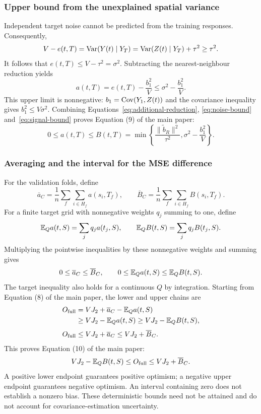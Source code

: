 \subsubsection{Upper bound from the unexplained spatial variance}
\label{sec:bound-signal}
Independent target noise cannot be predicted from the training responses. Consequently,
\[
 V-e(t,T)=\operatorname{Var}(Y(t)\mid Y_T)
 =\operatorname{Var}(Z(t)\mid Y_T)+\tau^2\geq\tau^2.
\]
It follows that $e(t,T)\leq V-\tau^2=\sigma^2$. Subtracting the nearest-neighbour reduction yields
\begin{equation}
 a(t,T)=e(t,T)-\frac{b_1^2}{V}
 \leq\sigma^2-\frac{b_1^2}{V}.
 \label{eq:signal-bound}
\end{equation}
This upper limit is nonnegative: $b_1=\operatorname{Cov}(Y_1,Z(t))$ and the covariance inequality gives $b_1^2\leq V\sigma^2$. Combining Equations~\eqref{eq:additional-reduction}, \eqref{eq:noise-bound} and~\eqref{eq:signal-bound} proves Equation (9) of the main paper:
\begin{equation}
 0\leq a(t,T)\leq B(t,T)
 =\min\left\{\frac{\|\widetilde b_R\|^2}{\tau^2},
               \sigma^2-\frac{b_1^2}{V}\right\}.
 \label{eq:pointwise-bound}
\end{equation}

\subsubsection{Averaging and the interval for the MSE difference}
\label{sec:bound-averaging}
For the validation folds, define
\[
 \overline a_C=\frac1n\sum_f\sum_{i\in H_f}a(s_i,T_f),
 \qquad
 \overline B_C=\frac1n\sum_f\sum_{i\in H_f}B(s_i,T_f).
\]
For a finite target grid with nonnegative weights $q_j$ summing to one, define
\[
 \mathbb{E}_Qa(t,S)=\sum_jq_j a(t_j,S),\qquad
 \mathbb{E}_QB(t,S)=\sum_jq_j B(t_j,S).
\]
Multiplying the pointwise inequalities by these nonnegative weights and summing gives
\[
 0\leq\overline a_C\leq\overline B_C,
 \qquad 0\leq\mathbb{E}_Qa(t,S)\leq\mathbb{E}_QB(t,S).
\]
The target inequality also holds for a continuous $Q$ by integration. Starting from Equation (8) of the main paper, the lower and upper chains are
\begin{align*}
 O_{\mathrm{full}}
 &=VJ_2+\overline a_C-\mathbb{E}_Qa(t,S)\\
 &\geq VJ_2-\mathbb{E}_Qa(t,S)\geq VJ_2-\mathbb{E}_QB(t,S),\\[3pt]
 O_{\mathrm{full}}
 &\leq VJ_2+\overline a_C\leq VJ_2+\overline B_C.
\end{align*}
This proves Equation (10) of the main paper:
\begin{equation}
 VJ_2-\mathbb{E}_QB(t,S)\leq O_{\mathrm{full}}
 \leq VJ_2+\overline B_C.
 \label{eq:optimism-bound}
\end{equation}
A positive lower endpoint guarantees positive optimism; a negative upper endpoint guarantees negative optimism. An interval containing zero does not establish a nonzero bias. These deterministic bounds need not be attained and do not account for covariance-estimation uncertainty.

